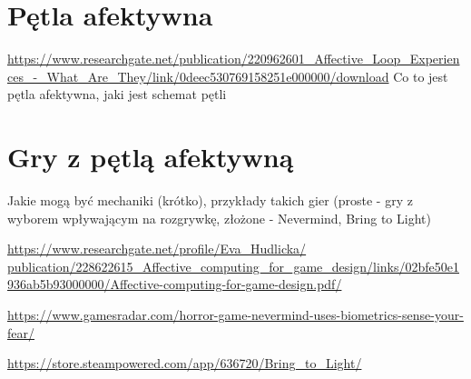 \section{Pętla afektywna}
\url{https://www.researchgate.net/publication/220962601_Affective_Loop_Experiences_-_What_Are_They/link/0deec530769158251e000000/download}
Co to jest pętla afektywna, jaki jest schemat pętli



\section{Gry z pętlą afektywną}
Jakie mogą być mechaniki (krótko), przykłady takich gier (proste - gry z wyborem wpływającym na rozgrywkę, złożone - Nevermind, Bring to Light)

\url{https://www.researchgate.net/profile/Eva_Hudlicka/ publication/228622615_Affective_computing_for_game_design/links/02bfe50e1936ab5b93000000/Affective-computing-for-game-design.pdf/}

\url{https://www.gamesradar.com/horror-game-nevermind-uses-biometrics-sense-your-fear/}

\url{https://store.steampowered.com/app/636720/Bring_to_Light/}


